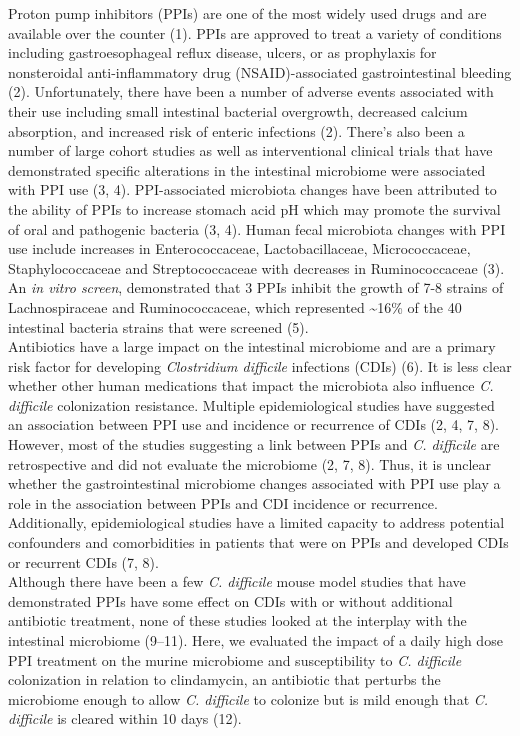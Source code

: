 \documentclass[11pt,]{article}
\begin{document}
Proton pump inhibitors (PPIs) are one of the most widely used drugs and
are available over the counter (1). PPIs are approved to treat a variety
of conditions including gastroesophageal reflux disease, ulcers, or as
prophylaxis for nonsteroidal anti-inflammatory drug (NSAID)-associated
gastrointestinal bleeding (2). Unfortunately, there have been a number
of adverse events associated with their use including small intestinal
bacterial overgrowth, decreased calcium absorption, and increased risk
of enteric infections (2). There's also been a number of large cohort
studies as well as interventional clinical trials that have demonstrated
specific alterations in the intestinal microbiome were associated with
PPI use (3, 4). PPI-associated microbiota changes have been attributed
to the ability of PPIs to increase stomach acid pH which may promote the
survival of oral and pathogenic bacteria (3, 4). Human fecal microbiota
changes with PPI use include increases in Enterococcaceae,
Lactobacillaceae, Micrococcaceae, Staphylococcaceae and Streptococcaceae
with decreases in Ruminococcaceae (3). An \emph{in vitro screen},
demonstrated that 3 PPIs inhibit the growth of 7-8 strains of
Lachnospiraceae and Ruminococcaceae, which represented
\textasciitilde{}16\% of the 40 intestinal bacteria strains that were
screened (5).\\
Antibiotics have a large impact on the intestinal microbiome and are a
primary risk factor for developing \emph{Clostridium difficile}
infections (CDIs) (6). It is less clear whether other human medications
that impact the microbiota also influence \emph{C. difficile}
colonization resistance. Multiple epidemiological studies have suggested
an association between PPI use and incidence or recurrence of CDIs (2,
4, 7, 8). However, most of the studies suggesting a link between PPIs
and \emph{C. difficile} are retrospective and did not evaluate the
microbiome (2, 7, 8). Thus, it is unclear whether the gastrointestinal
microbiome changes associated with PPI use play a role in the
association between PPIs and CDI incidence or recurrence. Additionally,
epidemiological studies have a limited capacity to address potential
confounders and comorbidities in patients that were on PPIs and
developed CDIs or recurrent CDIs (7, 8).\\
Although there have been a few \emph{C. difficile} mouse model studies
that have demonstrated PPIs have some effect on CDIs with or without
additional antibiotic treatment, none of these studies looked at the
interplay with the intestinal microbiome (9--11). Here, we evaluated the
impact of a daily high dose PPI treatment on the murine microbiome and
susceptibility to \emph{C. difficile} colonization in relation to
clindamycin, an antibiotic that perturbs the microbiome enough to allow
\emph{C. difficile} to colonize but is mild enough that \emph{C.
difficile} is cleared within 10 days (12).
\end{document}
